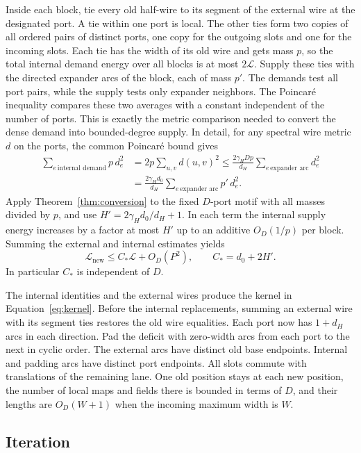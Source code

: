 Inside each block, tie every old half-wire to its segment of the external
wire at the designated port. A tie within one port is local. The other ties
form two copies of all ordered pairs of distinct ports, one copy for the
outgoing slots and one for the incoming slots. Each tie has the width of its
old wire and gets mass $p$, so the total internal demand energy over all blocks
is at most $2\mathcal L$. Supply these ties with the directed expander arcs of
the block, each of mass $p'$. The demands test all port pairs, while the
supply tests only expander neighbors. The Poincar\'e inequality compares these
two averages with a constant independent of the number of ports. This is
exactly the metric comparison needed to convert the dense demand into
bounded-degree supply. In detail, for any spectral wire metric $d$ on the ports,
the common Poincar\'e bound gives
\begin{align*}
 \sum_{e\,\text{internal demand}}p\, d_e^2
   &= 2p\sum_{u,v}d(u,v)^2
    \le \frac{2\gamma_H Dp}{d_H}\sum_{e\,\text{expander arc}}d_e^2 \\
   &= \frac{2\gamma_H d_0}{d_H}\sum_{e\,\text{expander arc}}p'\,d_e^2 .
\end{align*}
Apply Theorem~\ref{thm:conversion} to the fixed $D$-port motif with all
masses divided by $p$, and use $H'=2\gamma_Hd_0/d_H+1$.
In each term the internal supply energy increases by a factor at most $H'$
up to an additive $O_D(1/p)$ per block. Summing the external and internal
estimates yields
\begin{equation}\label{eq:compress-refresh}
 \mathcal L_{\mathrm{new}}\le C_*\mathcal L+O_D(P^2),
 \qquad C_*=d_0+2H'.
\end{equation}
In particular $C_*$ is independent of $D$.

The internal identities and the external wires produce the
kernel in Equation~\eqref{eq:kernel}. Before the internal replacements,
summing an external wire with its segment ties restores the old wire equalities.
Each port now has $1+d_H$ arcs in each direction. Pad the deficit with
zero-width arcs from each port to the next in cyclic order. The external
arcs have distinct old base endpoints. Internal and padding arcs have distinct
port endpoints. All slots commute with translations of the remaining lane.
One old position stays at each new position, the number of local maps and
fields there is bounded in terms of $D$, and their lengths are
$O_D(W+1)$ when the incoming maximum width is $W$.

\subsection{Iteration}

